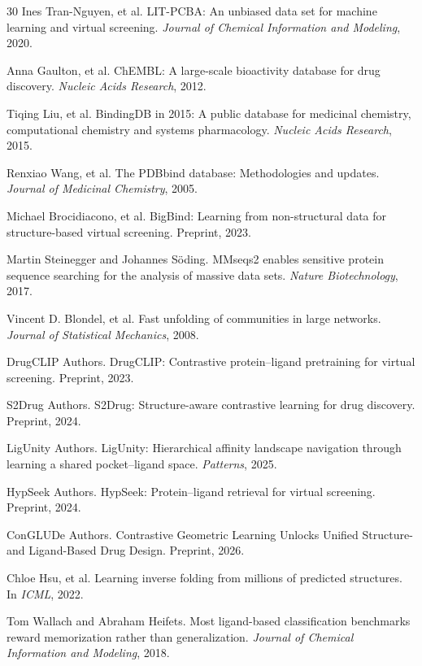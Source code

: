 \documentclass[11pt]{article}
\begin{document}
\begin{thebibliography}{30}
Ines Tran-Nguyen, et al.
\newblock LIT-PCBA: An unbiased data set for machine learning and virtual screening.
\newblock \emph{Journal of Chemical Information and Modeling}, 2020.

Anna Gaulton, et al.
\newblock ChEMBL: A large-scale bioactivity database for drug discovery.
\newblock \emph{Nucleic Acids Research}, 2012.

Tiqing Liu, et al.
\newblock BindingDB in 2015: A public database for medicinal chemistry, computational chemistry and systems pharmacology.
\newblock \emph{Nucleic Acids Research}, 2015.

Renxiao Wang, et al.
\newblock The PDBbind database: Methodologies and updates.
\newblock \emph{Journal of Medicinal Chemistry}, 2005.

Michael Brocidiacono, et al.
\newblock BigBind: Learning from non-structural data for structure-based virtual screening.
\newblock Preprint, 2023.

Martin Steinegger and Johannes S\"oding.
\newblock MMseqs2 enables sensitive protein sequence searching for the analysis of massive data sets.
\newblock \emph{Nature Biotechnology}, 2017.

Vincent D. Blondel, et al.
\newblock Fast unfolding of communities in large networks.
\newblock \emph{Journal of Statistical Mechanics}, 2008.

DrugCLIP Authors.
\newblock DrugCLIP: Contrastive protein--ligand pretraining for virtual screening.
\newblock Preprint, 2023.

S2Drug Authors.
\newblock S2Drug: Structure-aware contrastive learning for drug discovery.
\newblock Preprint, 2024.

LigUnity Authors.
\newblock LigUnity: Hierarchical affinity landscape navigation through learning a shared pocket--ligand space.
\newblock \emph{Patterns}, 2025.

HypSeek Authors.
\newblock HypSeek: Protein--ligand retrieval for virtual screening.
\newblock Preprint, 2024.

ConGLUDe Authors.
\newblock Contrastive Geometric Learning Unlocks Unified Structure- and Ligand-Based Drug Design.
\newblock Preprint, 2026.

Chloe Hsu, et al.
\newblock Learning inverse folding from millions of predicted structures.
\newblock In \emph{ICML}, 2022.

Tom Wallach and Abraham Heifets.
\newblock Most ligand-based classification benchmarks reward memorization rather than generalization.
\newblock \emph{Journal of Chemical Information and Modeling}, 2018.

\end{thebibliography}
\end{document}
